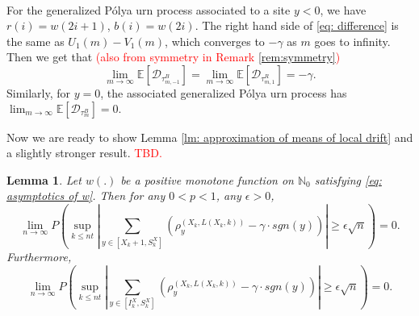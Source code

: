 \documentclass[twoside,12pt,a4paper]{article}
\newtheorem{lemma}{Lemma}[section]
\numberwithin{equation}{section}
\newcommand{\abs}[1]{\left\vert #1 \right\vert}
\newcommand\TBD{\textcolor{red}{TBD.}}
\newcommand{\edt}[1]{\textcolor{red}{#1}} %
\begin{document}
	\\
	For the generalized P\'{o}lya urn process associated to a site $y<0$, we have $r(i) = w(2i+1)$, $b(i) =w(2i)$. The right hand side of \eqref{eq: difference} is the same as $U_1(m)-V_1(m)$, which converges to $-\gamma$ as $m$ goes to infinity. Then we get that  \edt{(also from symmetry in Remark \ref{rem:symmetry})}
	\begin{equation}\label{eq: general expected drift}
		\lim_{m\to\infty}\mathbb{E}\left[ \mathcal{D}_{\tau^B_{m,-1}} \right] = \lim_{m\to\infty}\mathbb{E}\left[ \mathcal{D}_{\tau^R_{m,1}} \right] = -\gamma.
	\end{equation}
	Similarly, for $y=0$, the associated generalized P\'{o}lya urn process has 
	$\lim_{m\to\infty}\mathbb{E}\left[ \mathcal{D}_{\tau^B_m} \right] = 0.$
	
	Now we are ready to show Lemma \ref{lm: approximation of means of local drift}
	and a slightly stronger result. \TBD
	\begin{lemma}
		Let $w(.)$ be a positive monotone function on $\mathbb{N}_0$ satisfying \eqref{eq: asymptotics of w}. Then for any $0<p<1$, any $\epsilon>0$,
		$$
		\lim_{n\to\infty} P\left( \sup_{k\leq n t}  \abs{  	\sum_{y\in \left[X_{k}+1 ,S_{k}^X\right]} \left( \rho^{(X_k,L(X_k,k))}_y -  \gamma \cdot sgn(y) \right) } \geq  \epsilon \sqrt{n}     \right) =0.
		$$
		Furthermore,
		\[
		\lim_{n\to\infty} P\left( \sup_{k\leq n t}  \abs{  	\sum_{y\in \left[I_k^{X} ,S_{k}^X\right]} \left( \rho^{(X_k,L(X_k,k))}_y -  \gamma \cdot sgn(y) \right) } \geq  \epsilon \sqrt{n}     \right) =0.
		\]
	\end{lemma}
\end{document}
